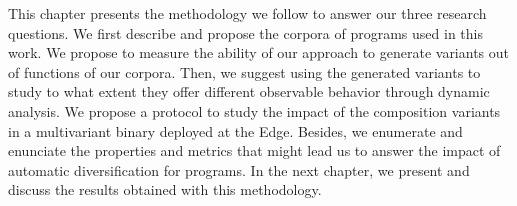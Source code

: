 This chapter presents the methodology we follow to answer our three research questions. We first describe and propose the corpora of programs used in this work. We propose to measure the ability of our approach to generate variants out of  functions of our corpora. Then, we suggest using the generated variants to study to what extent they offer different observable behavior through dynamic analysis. We propose a protocol to study the impact of the composition variants in a multivariant binary deployed at the Edge. Besides, we enumerate and enunciate the properties and metrics that might lead us to answer the impact of automatic diversification for \wasm programs. In the next chapter, we present and discuss the results obtained with this methodology.



\clearpage